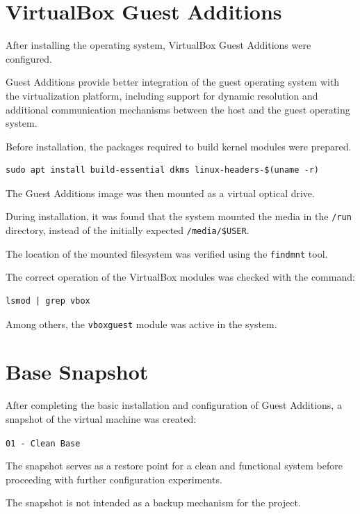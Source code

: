 \section{VirtualBox Guest Additions}

After installing the operating system, VirtualBox Guest Additions were configured.

Guest Additions provide better integration of the guest operating system
with the virtualization platform, including support for dynamic resolution
and additional communication mechanisms between the host and the guest operating system.

Before installation, the packages required to build kernel modules were prepared.

\begin{lstlisting}[style=terminal]
sudo apt install build-essential dkms linux-headers-$(uname -r)
\end{lstlisting}

The Guest Additions image was then mounted as a virtual
optical drive.

During installation, it was found that the system mounted the media in the
\texttt{/run} directory, instead of the initially expected \texttt{/media/\$USER}.

The location of the mounted filesystem was verified using
the \texttt{findmnt} tool.

The correct operation of the VirtualBox modules was checked with the command:

\begin{lstlisting}[style=terminal]
lsmod | grep vbox
\end{lstlisting}

Among others, the \texttt{vboxguest} module was active in the system.

\section{Base Snapshot}

After completing the basic installation and configuration of Guest Additions,
a snapshot of the virtual machine was created:

\begin{center}
\texttt{01 - Clean Base}
\end{center}

The snapshot serves as a restore point for a clean and functional system before
proceeding with further configuration experiments.

The snapshot is not intended as a backup mechanism for the project.